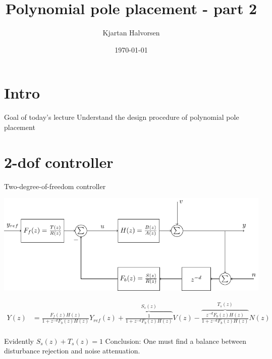 \documentclass[presentation,aspectratio=169]{beamer}
\author{Kjartan Halvorsen}
\date{\today}
\title{Polynomial pole placement - part 2}
\begin{document}
\maketitle


\section{Intro}
\label{sec:org818d44f}

\begin{frame}[label={sec:orgbc7eded}]{Goal of today's lecture}
Understand the design procedure of polynomial pole placement
\end{frame}


\section{2-dof controller}
\label{sec:org1fb4a8a}

\begin{frame}[label={sec:org45c069c}]{Two-degree-of-freedom controller}
\begin{center}
\includegraphics[width=0.7\linewidth]{../../figures/2dof-block-explicit}
\end{center}

\begin{align*}
Y(z)     &= \frac{F_f(z)H(z)}{1 + z^{-d}F_b(z)H(z)}Y_{ref}(z) + \overbrace{\frac{1}{1 + z^{-d}F_b(z)H(z)}}^{S_s(z)}V(z)  - \overbrace{\frac{z^{-d}F_b(z)H(z)}{1 + z^{-d}F_b(z)H(z)}}^{T_s(z)}N(z)\\
\end{align*}

\alert{Evidently} \(S_s(z) + T_s(z) = 1\) \alert{Conclusion:} One must find a balance between disturbance rejection and noise attenuation.
\end{frame}
\end{document}
